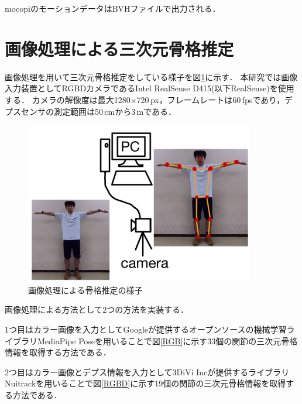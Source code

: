 \documentclass[a4j, fleqn, 12pt]{jsreport}
\begin{document}
mocopiのモーションデータはBVHファイルで出力される．

\section{画像処理による三次元骨格推定}\label{3Dskeleton}
画像処理を用いて三次元骨格推定をしている様子を図\ref{image_3D}に示す．
本研究では画像入力装置としてRGBDカメラであるIntel RealSense D415(以下RealSense)を使用する．
カメラの解像度は最大1280$\times$720\,px，フレームレートは60\,fpsであり，デプスセンサの測定範囲は50\,cmから3\,mである．
\begin{figure}[b]
  \centering
  \includegraphics[width=10cm]{img/image_3D.jpg}
  \caption{画像処理による骨格推定の様子}
  \label{image_3D}
\end{figure}

画像処理による方法として2つの方法を実装する．

1つ目はカラー画像を入力としてGoogleが提供するオープンソースの機械学習ライブラリMediaPipe Poseを用いることで図\ref{RGB}に示す33個の関節の三次元骨格情報を取得する方法である．

2つ目はカラー画像とデプス情報を入力として3DiVi Incが提供するライブラリNuitrackを用いることで図\ref{RGBD}に示す19個の関節の三次元骨格情報を取得する方法である．
\end{document}
